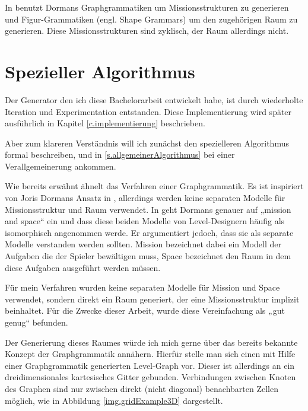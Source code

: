 In \cite{dormansAdventures} benutzt Dormans Graphgrammatiken um Missionsstrukturen zu generieren und Figur-Grammatiken (engl. Shape Grammars) um den zugehörigen Raum zu generieren. Diese Missionsstrukturen sind zyklisch, der Raum allerdings nicht.

\section{Spezieller Algorithmus}\label{s.speziellerAlgorithmus}

Der Generator den ich diese Bachelorarbeit entwickelt habe, ist durch wiederholte Iteration und Experimentation entstanden. Diese Implementierung wird später ausführlich in Kapitel \ref{c.implementierung} beschrieben.

Aber zum klareren Verständnis will ich zunächst den spezielleren Algorithmus formal beschreiben, und in 
\ref{s.allgemeinerAlgorithmus} bei einer Verallgemeinerung ankommen. 

Wie bereits erwähnt ähnelt das Verfahren einer Graphgrammatik. Es ist inspiriert von Joris Dormans Ansatz in 
\cite{dormansAdventures},
allerdings werden keine separaten Modelle für Missionsstruktur und Raum verwendet.
In \cite[2.]{dormansModelTransformation} geht Dormans genauer auf „mission and space“ ein und dass diese beiden Modelle von Level-Designern häufig als isomorphisch angenommen werde. Er argumentiert jedoch, dass sie als separate Modelle verstanden werden sollten. Mission bezeichnet dabei ein Modell der Aufgaben die der Spieler bewältigen muss, Space bezeichnet den Raum in dem diese Aufgaben ausgeführt werden müssen.

Für mein Verfahren wurden keine separaten Modelle für Mission und Space verwendet, sondern direkt ein Raum generiert, der eine Missionsstruktur implizit beinhaltet. Für die Zwecke dieser Arbeit, wurde diese Vereinfachung als „gut genug“ befunden.

Der Generierung dieses Raumes würde ich mich gerne über das bereits bekannte Konzept der Graphgrammatik annähern. Hierfür stelle man sich einen mit Hilfe einer Graphgrammatik generierten Level-Graph vor. Dieser ist allerdings an ein dreidimensionales kartesisches Gitter gebunden. Verbindungen zwischen Knoten des Graphen sind nur zwischen direkt (nicht diagonal) benachbarten Zellen möglich, wie in Abbildung \ref{img.gridExample3D} dargestellt.


